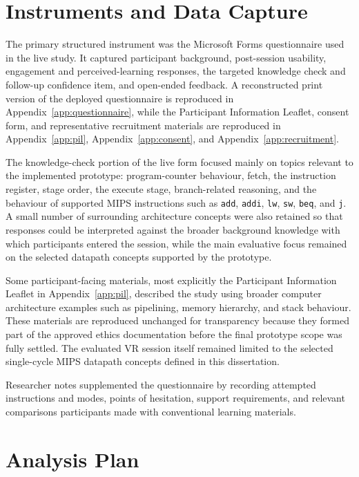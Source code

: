 \section{Instruments and Data Capture}

The primary structured instrument was the Microsoft Forms questionnaire used in the live study. It captured participant background, post-session usability, engagement and perceived-learning responses, the targeted knowledge check and follow-up confidence item, and open-ended feedback. A reconstructed print version of the deployed questionnaire is reproduced in Appendix~\ref{app:questionnaire}, while the Participant Information Leaflet, consent form, and representative recruitment materials are reproduced in Appendix~\ref{app:pil}, Appendix~\ref{app:consent}, and Appendix~\ref{app:recruitment}.

The knowledge-check portion of the live form focused mainly on topics relevant to the implemented prototype: program-counter behaviour, fetch, the instruction register, stage order, the execute stage, branch-related reasoning, and the behaviour of supported MIPS instructions such as \texttt{add}, \texttt{addi}, \texttt{lw}, \texttt{sw}, \texttt{beq}, and \texttt{j}. A small number of surrounding architecture concepts were also retained so that responses could be interpreted against the broader background knowledge with which participants entered the session, while the main evaluative focus remained on the selected datapath concepts supported by the prototype.

Some participant-facing materials, most explicitly the Participant Information Leaflet in Appendix~\ref{app:pil}, described the study using broader computer architecture examples such as pipelining, memory hierarchy, and stack behaviour. These materials are reproduced unchanged for transparency because they formed part of the approved ethics documentation before the final prototype scope was fully settled. The evaluated VR session itself remained limited to the selected single-cycle MIPS datapath concepts defined in this dissertation.

Researcher notes supplemented the questionnaire by recording attempted instructions and modes, points of hesitation, support requirements, and relevant comparisons participants made with conventional learning materials.

\section{Analysis Plan}

